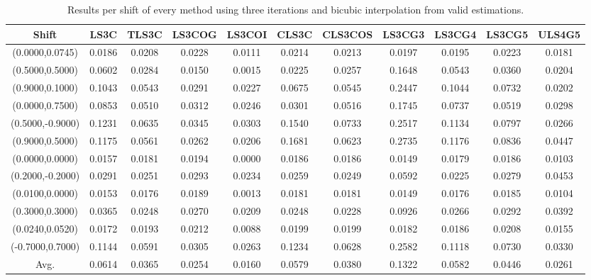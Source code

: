 \begin{table}[ht!]
\centering
\begin{tabular}{c|c|c|c|c|c|c|c|c|c|c}
Shift & \scriptsize{LS3C} & \scriptsize{TLS3C} & \scriptsize{LS3COG} & \scriptsize{LS3COI} & \scriptsize{CLS3C} & \scriptsize{CLS3COS} & \scriptsize{LS3CG3} & \scriptsize{LS3CG4} & \scriptsize{LS3CG5} & \scriptsize{ULS4G5}\\ \hline 
(0.0000,0.0745) & 0.0186 & 0.0208 & 0.0228 & 0.0111 & 0.0214 & 0.0213 & 0.0197 & 0.0195 & 0.0223 & 0.0181 \\ \hline
(0.5000,0.5000) & 0.0602 & 0.0284 & 0.0150 & 0.0015 & 0.0225 & 0.0257 & 0.1648 & 0.0543 & 0.0360 & 0.0204 \\ \hline
(0.9000,0.1000) & 0.1043 & 0.0543 & 0.0291 & 0.0227 & 0.0675 & 0.0545 & 0.2447 & 0.1044 & 0.0732 & 0.0202 \\ \hline
(0.0000,0.7500) & 0.0853 & 0.0510 & 0.0312 & 0.0246 & 0.0301 & 0.0516 & 0.1745 & 0.0737 & 0.0519 & 0.0298 \\ \hline
(0.5000,-0.9000) & 0.1231 & 0.0635 & 0.0345 & 0.0303 & 0.1540 & 0.0733 & 0.2517 & 0.1134 & 0.0797 & 0.0266 \\ \hline
(0.9000,0.5000) & 0.1175 & 0.0561 & 0.0262 & 0.0206 & 0.1681 & 0.0623 & 0.2735 & 0.1176 & 0.0836 & 0.0447 \\ \hline
(0.0000,0.0000) & 0.0157 & 0.0181 & 0.0194 & 0.0000 & 0.0186 & 0.0186 & 0.0149 & 0.0179 & 0.0186 & 0.0103 \\ \hline
(0.2000,-0.2000) & 0.0291 & 0.0251 & 0.0293 & 0.0234 & 0.0259 & 0.0249 & 0.0592 & 0.0225 & 0.0279 & 0.0453 \\ \hline
(0.0100,0.0000) & 0.0153 & 0.0176 & 0.0189 & 0.0013 & 0.0181 & 0.0181 & 0.0149 & 0.0176 & 0.0185 & 0.0104 \\ \hline
(0.3000,0.3000) & 0.0365 & 0.0248 & 0.0270 & 0.0209 & 0.0248 & 0.0228 & 0.0926 & 0.0266 & 0.0292 & 0.0392 \\ \hline
(0.0240,0.0520) & 0.0172 & 0.0193 & 0.0212 & 0.0088 & 0.0199 & 0.0199 & 0.0182 & 0.0186 & 0.0208 & 0.0155 \\ \hline
(-0.7000,0.7000) & 0.1144 & 0.0591 & 0.0305 & 0.0263 & 0.1234 & 0.0628 & 0.2582 & 0.1118 & 0.0730 & 0.0330 \\ \hline
Avg.  & 0.0614 & 0.0365 & 0.0254 & 0.0160 & 0.0579 & 0.0380 & 0.1322 & 0.0582 & 0.0446 & 0.0261 \\ \hline
\end{tabular}
\caption{Results per shift of every method using three  iterations and bicubic interpolation from valid estimations.}
\label{tab:3itCperShiftValid}
\end{table}



